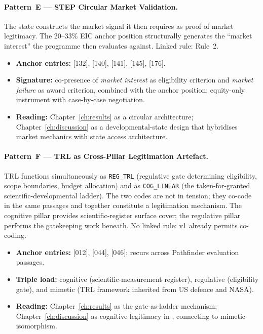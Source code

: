 \paragraph{Pattern~E --- STEP Circular Market Validation.}
The state constructs the market signal it then requires as proof of
market legitimacy. The 20--33\% EIC anchor position structurally
generates the \enquote{market interest} the programme then evaluates
against. Linked rule: Rule~2.

\begin{itemize}[leftmargin=*]
  \item \textbf{Anchor entries:} [132], [140], [141], [145], [176].
  \item \textbf{Signature:} co-presence of \emph{market interest} as
    eligibility criterion and \emph{market failure} as award
    criterion, combined with the anchor position; equity-only
    instrument with case-by-case negotiation.
  \item \textbf{Reading:} Chapter~\ref{ch:results} as a circular
    architecture; Chapter~\ref{ch:discussion} as a
    developmental-state design that hybridises market mechanics with
    state access architecture.
\end{itemize}

\paragraph{Pattern~F --- TRL as Cross-Pillar Legitimation Artefact.}
TRL functions simultaneously as \texttt{REG\_TRL} (regulative gate
determining eligibility, scope boundaries, budget allocation) and as
\texttt{COG\_LINEAR} (the taken-for-granted scientific-developmental
ladder). The two codes are not in tension; they co-code in the same
passages and together constitute a legitimation mechanism. The
cognitive pillar provides scientific-register surface cover; the
regulative pillar performs the gatekeeping work beneath. No linked
rule: v1 already permits co-coding.

\begin{itemize}[leftmargin=*]
  \item \textbf{Anchor entries:} [012], [044], [046]; recurs across
    Pathfinder evaluation passages.
  \item \textbf{Triple load:} cognitive (scientific-measurement
    register), regulative (eligibility gate), and mimetic (TRL framework
    inherited from US defence and NASA).
  \item \textbf{Reading:} Chapter~\ref{ch:results} as the gate-as-ladder
    mechanism; Chapter~\ref{ch:discussion} as cognitive legitimacy in
    \textcite{suchman1995managing}, connecting to mimetic isomorphism.
\end{itemize}

